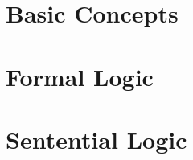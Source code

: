 \documentclass[openany, twoside]{book}
\begin{document}
\raggedright
\setlength{\parindent}{1em}
\setlength{\parskip}{1em}	

\frontmatter
\pagestyle{plain} %

	


{
\setlength{\parskip}{0em}

\renewcommand{\cftpartpresnum}{\sf\Large\partname\ }
\tableofcontents
}






\mainmatter
\setlength{\parindent}{1em}
\pagestyle{headings} %
\label{full_version} %


\part{Basic Concepts} \label{part:basic_concepts}
	


\part{Formal Logic} \label{part:formal_logic}



\part{Sentential Logic} \label{part:sent_logic}
	





\end{document}
